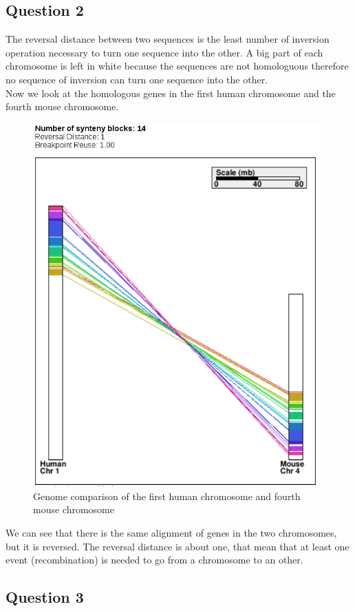 \documentclass[]{article}
\theoremstyle{definition}
\begin{document}
\subsection{Question 2}

The reversal distance between two sequences is the least number of inversion operation necessary to turn one sequence into the other. A big part of each chromosome is left in white because the sequences are not homologuous therefore no sequence of inversion can turn one sequence into the other. \\

Now we look at the homologous genes in the first human chromosome and the fourth mouse chromosome.
\begin{figure}[H]
	\includegraphics*[width = 11cm]{../H1_M4.png}
	\caption{\label{h1_m4} Genome comparison of the first human chromosome and fourth mouse chromosome }
\end{figure}
	We can see that there is the same alignment of genes in the two chromosomes, but it is reversed. The reversal distance is about one, that mean that at least one event (recombination) is needed to go from a chromosome to an other.   

\subsection{Question 3}
\end{document}
